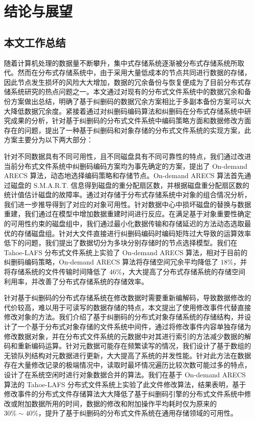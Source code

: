\chapter{结论与展望}
\section{本文工作总结}
随着计算机处理的数据量不断攀升，集中式存储系统逐渐被分布式存储系统所取代。然而在分布式存储系统中，由于采用大量低成本的节点共同进行数据的存储，因此节点发生损坏的风险大大增加，数据的冗余备份与恢复便成为了目前分布式存储系统研究的热点问题之一。本文通过对现有的分布式文件系统中的数据冗余和备份方案做出总结，明确了基于纠删码的数据冗余方案相比于多副本备份方案可以大大降低数据冗余度。紧接着通过对纠删码编码算法和纠删码在分布式存储系统中研究成果的分析，针对基于纠删码的分布式文件系统中编码策略方面和数据修改方面存在的问题，提出了一种基于纠删码和对象存储的分布式文件系统的实现方案，此方案主要分为以下两大部分：

针对不同数据具有不同可用性，且不同磁盘具有不同可靠性的特点，我们通过改进当前分布式文件系统中纠删码编码方案均为事先确定的方案，提出了 On-demand ARECS 算法，动态地选择编码策略和存储节点。On-demand ARECS 算法首先通过磁盘的 S.M.A.R.T. 信息得到磁盘的重分配扇区数，并根据磁盘重分配扇区数的统计值估计磁盘的故障率。通过对存储于分布式存储系统中对象的组合情况分析，我们进一步推导得到了对应的对象可用性。针对数据中心中损坏磁盘的替换与数据重建，我们通过在模型中增加数据重建时间进行反应。在满足基于对象重要性确定的可用性约束的磁盘组中，我们通过最小化数据传输和存储延迟的方法动态选取最优的存储磁盘组。针对大文件直接进行纠删码编码时编码矩阵过大导致的运算效率低下的问题，我们提出了数据切分为多块分别存储时的节点选择模型。我们在 Tahoe-LAFS 分布式文件系统上实验了 On-demand ARECS 算法，相对于目前的纠删码编码策略，On-demand ARECS 算法将存储空间冗余平均降低了 $18\%$，并将存储系统的文件传输时间降低了 $46\%$，大大提高了分布式存储系统的存储空间利用率，并改善了分布式存储系统的存储效率。

针对基于纠删码的分布式存储系统在修改数据时需要重新编解码，导致数据修改的代价较高，难以用于可读写的数据存储的特点，本文提出了使用修改事件代替直接修改对象的方法。我们介绍了基于纠删码的分布式对象存储系统的存储结构，并设计了一个基于分布式对象存储的文件系统中间件，通过将修改事件内容单独存储为修改数据对象，并在分布式文件系统的元数据中对其进行索引的方法减少数据的解码和重新编码运算。针对元数据可能存在频繁读写的情况，我们设计了基于数组的无锁队列结构对元数据进行更新，大大提高了系统的并发性能。针对此方法在数据存在大量修改记录的极端情况中，读取时最坏情况遍历比较次数可能过多的特点，设计了在系统空闲时进行对象数据合并的算法。我们在基于 On-demand ARECS 算法的 Tahoe-LAFS 分布式文件系统上实验了此文件修改算法，结果表明，基于修改事件的分布式文件存储算法大大降低了基于纠删码引擎的分布式文件系统中修改或附加数据所用的时间，数据的修改和附加操作平均耗时仅为原来的 $30\%\sim40\%$，提升了基于纠删码的分布式文件系统在通用存储领域的可用性。

